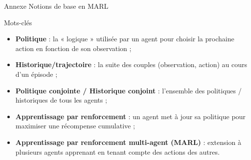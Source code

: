 \begin{frame}{Annexe}
    {Notions de base en MARL}

    \begin{block}{Mots-clés}
        \begin{itemize}
            \item \textbf{Politique} : la « logique » utilisée par un agent pour choisir la prochaine action en fonction de son observation ;
            \item \textbf{Historique/trajectoire} : la suite des couples (observation, action) au cours d’un épisode ;
            \item \textbf{Politique conjointe / Historique conjoint} : l’ensemble des politiques / historiques de tous les agents ;
            \item \textbf{Apprentissage par renforcement} : un agent met à jour sa politique pour maximiser une récompense cumulative ;
            \item \textbf{Apprentissage par renforcement multi-agent (MARL)} : extension à plusieurs agents apprenant en tenant compte des actions des autres.
        \end{itemize}
    \end{block}

\end{frame}

